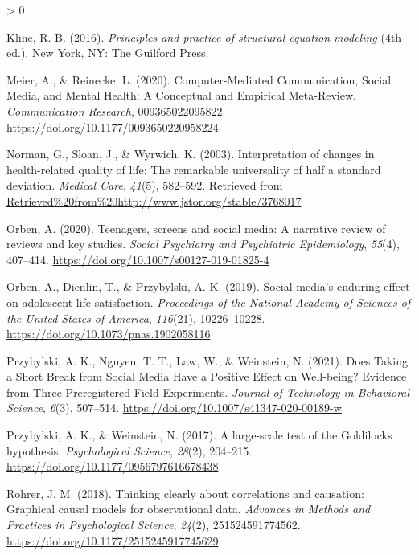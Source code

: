 \documentclass[
  english,
  man,mask,floatsintext]{apa6}
\newlength{\cslhangindent}
\newenvironment{CSLReferences}[2] %
 {%
  \setlength{\parindent}{0pt}
  \ifodd #1 \everypar{\setlength{\hangindent}{\cslhangindent}}\ignorespaces\fi
  \ifnum #2 > 0
  \setlength{\parskip}{#2\baselineskip}
  \fi
 }%
 {}
\begin{document}
\begin{CSLReferences}{1}{0}
\leavevmode\hypertarget{ref-klinePrinciplesPracticeStructural2016}{}%
Kline, R. B. (2016). \emph{Principles and practice of structural equation modeling} (4th ed.). New York, NY: The Guilford Press.

\leavevmode\hypertarget{ref-meierComputerMediatedCommunicationSocial2020}{}%
Meier, A., \& Reinecke, L. (2020). Computer-{Mediated} {Communication}, {Social} {Media}, and {Mental} {Health}: {A} {Conceptual} and {Empirical} {Meta}-{Review}. \emph{Communication Research}, 009365022095822. \url{https://doi.org/10.1177/0093650220958224}

\leavevmode\hypertarget{ref-normanInterpretationChangesHealthrelated2003}{}%
Norman, G., Sloan, J., \& Wyrwich, K. (2003). Interpretation of changes in health-related quality of life: {The} remarkable universality of half a standard deviation. \emph{Medical Care}, \emph{41}(5), 582--592. Retrieved from \url{Retrieved\%20from\%20http://www.jstor.org/stable/3768017}

\leavevmode\hypertarget{ref-orbenTeenagersScreensSocial2020}{}%
Orben, A. (2020). Teenagers, screens and social media: A narrative review of reviews and key studies. \emph{Social Psychiatry and Psychiatric Epidemiology}, \emph{55}(4), 407--414. \url{https://doi.org/10.1007/s00127-019-01825-4}

\leavevmode\hypertarget{ref-orbenSocialMediaEnduring2019}{}%
Orben, A., Dienlin, T., \& Przybylski, A. K. (2019). Social media's enduring effect on adolescent life satisfaction. \emph{Proceedings of the National Academy of Sciences of the United States of America}, \emph{116}(21), 10226--10228. \url{https://doi.org/10.1073/pnas.1902058116}

\leavevmode\hypertarget{ref-przybylskiDoesTakingShort2021a}{}%
Przybylski, A. K., Nguyen, T. T., Law, W., \& Weinstein, N. (2021). Does {Taking} a {Short} {Break} from {Social} {Media} {Have} a {Positive} {Effect} on {Well}-being? {Evidence} from {Three} {Preregistered} {Field} {Experiments}. \emph{Journal of Technology in Behavioral Science}, \emph{6}(3), 507--514. \url{https://doi.org/10.1007/s41347-020-00189-w}

\leavevmode\hypertarget{ref-przybylskiLargescaleTestGoldilocks2017}{}%
Przybylski, A. K., \& Weinstein, N. (2017). A large-scale test of the {Goldilocks} hypothesis. \emph{Psychological Science}, \emph{28}(2), 204--215. \url{https://doi.org/10.1177/0956797616678438}

\leavevmode\hypertarget{ref-rohrerThinkingClearlyCorrelations2018}{}%
Rohrer, J. M. (2018). Thinking clearly about correlations and causation: {Graphical} causal models for observational data. \emph{Advances in Methods and Practices in Psychological Science}, \emph{24}(2), 251524591774562. \url{https://doi.org/10.1177/2515245917745629}


\end{CSLReferences}
\end{document}
